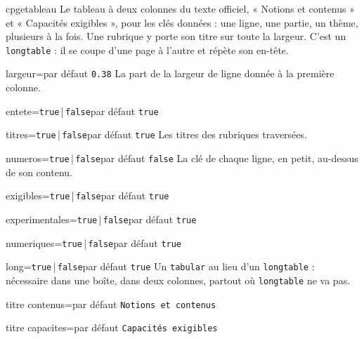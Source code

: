 \documentclass[a4paper,11pt]{article}
\begin{document}
\begin{docCommand}{cpgetableau}{}
  Le tableau à deux colonnes du texte officiel, « Notions et contenus » et
  « Capacités exigibles », pour les clés données : une ligne, une partie, un
  thème, plusieurs à la fois. Une rubrique y porte son titre sur toute la
  largeur. C'est un \texttt{longtable} : il se coupe d'une page à l'autre et
  répète son en-tête.
  \begin{docKey}{largeur}{=}{par défaut \texttt{0.38}}
    La part de la largeur de ligne donnée à la première colonne.
  \end{docKey}
  \begin{docKey}{entete}{=\texttt{true}\,|\,\texttt{false}}{par défaut \texttt{true}}\end{docKey}
  \begin{docKey}{titres}{=\texttt{true}\,|\,\texttt{false}}{par défaut \texttt{true}}
    Les titres des rubriques traversées.
  \end{docKey}
  \begin{docKey}{numeros}{=\texttt{true}\,|\,\texttt{false}}{par défaut \texttt{false}}
    La clé de chaque ligne, en petit, au-dessus de son contenu.
  \end{docKey}
  \begin{docKey}{exigibles}{=\texttt{true}\,|\,\texttt{false}}{par défaut \texttt{true}}\end{docKey}
  \begin{docKey}{experimentales}{=\texttt{true}\,|\,\texttt{false}}{par défaut \texttt{true}}\end{docKey}
  \begin{docKey}{numeriques}{=\texttt{true}\,|\,\texttt{false}}{par défaut \texttt{true}}\end{docKey}
  \begin{docKey}{long}{=\texttt{true}\,|\,\texttt{false}}{par défaut \texttt{true}}
    Un \texttt{tabular} au lieu d'un \texttt{longtable} : nécessaire dans une
    boîte, dans deux colonnes, partout où \texttt{longtable} ne va pas.
  \end{docKey}
  \begin{docKey}{titre contenus}{=}{par défaut \texttt{Notions et contenus}}\end{docKey}
  \begin{docKey}{titre capacites}{=}{par défaut \texttt{Capacités exigibles}}\end{docKey}
\end{docCommand}
\end{document}

